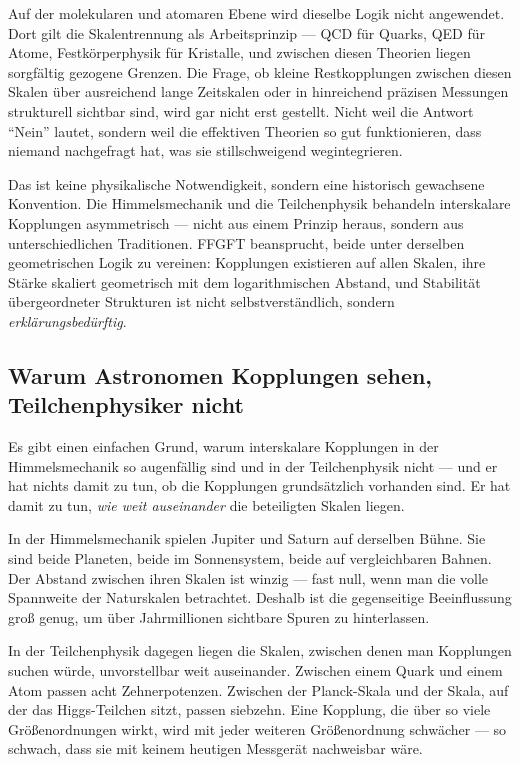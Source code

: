 Auf der molekularen und atomaren Ebene wird dieselbe Logik nicht
angewendet. Dort gilt die Skalentrennung als Arbeitsprinzip --- QCD
für Quarks, QED für Atome, Festkörperphysik für Kristalle, und zwischen
diesen Theorien liegen sorgfältig gezogene Grenzen. Die Frage, ob
kleine Restkopplungen zwischen diesen Skalen über ausreichend lange
Zeitskalen oder in hinreichend präzisen Messungen strukturell sichtbar
sind, wird gar nicht erst gestellt. Nicht weil die Antwort ``Nein''
lautet, sondern weil die effektiven Theorien so gut funktionieren, dass
niemand nachgefragt hat, was sie stillschweigend wegintegrieren.

Das ist keine physikalische Notwendigkeit, sondern eine historisch
gewachsene Konvention. Die Himmelsmechanik und die Teilchenphysik
behandeln interskalare Kopplungen asymmetrisch --- nicht aus einem
Prinzip heraus, sondern aus unterschiedlichen Traditionen. FFGFT
beansprucht, beide unter derselben geometrischen Logik zu vereinen:
Kopplungen existieren auf allen Skalen, ihre Stärke skaliert
geometrisch mit dem logarithmischen Abstand, und Stabilität übergeordneter
Strukturen ist nicht selbstverständlich, sondern \emph{erklärungs\-bedürftig}.

\subsection*{Warum Astronomen Kopplungen sehen, Teilchenphysiker nicht}

Es gibt einen einfachen Grund, warum interskalare Kopplungen in der
Himmelsmechanik so augenfällig sind und in der Teilchenphysik nicht ---
und er hat nichts damit zu tun, ob die Kopplungen grundsätzlich
vorhanden sind. Er hat damit zu tun, \emph{wie weit auseinander} die
beteiligten Skalen liegen.

In der Himmelsmechanik spielen Jupiter und Saturn auf derselben Bühne.
Sie sind beide Planeten, beide im Sonnensystem, beide auf vergleichbaren
Bahnen. Der Abstand zwischen ihren Skalen ist winzig --- fast null,
wenn man die volle Spannweite der Naturskalen betrachtet. Deshalb ist
die gegenseitige Beeinflussung groß genug, um über Jahrmillionen
sichtbare Spuren zu hinterlassen.

In der Teilchenphysik dagegen liegen die Skalen, zwischen denen man
Kopplungen suchen würde, unvorstellbar weit auseinander. Zwischen einem
Quark und einem Atom passen acht Zehnerpotenzen. Zwischen der
Planck-Skala und der Skala, auf der das Higgs-Teilchen sitzt,
passen siebzehn. Eine Kopplung, die über so viele Größenordnungen
wirkt, wird mit jeder weiteren Größenordnung schwächer --- so schwach,
dass sie mit keinem heutigen Messgerät nachweisbar wäre.

